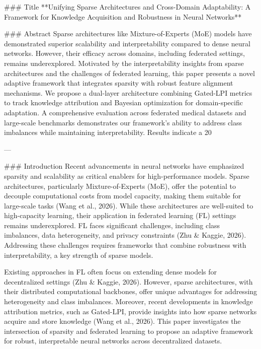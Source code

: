 ### Title
**Unifying Sparse Architectures and Cross-Domain Adaptability: A Framework for Knowledge Acquisition and Robustness in Neural Networks**

### Abstract
Sparse architectures like Mixture-of-Experts (MoE) models have demonstrated superior scalability and interpretability compared to dense neural networks. However, their efficacy across domains, including federated settings, remains underexplored. Motivated by the interpretability insights from sparse architectures and the challenges of federated learning, this paper presents a novel adaptive framework that integrates sparsity with robust feature alignment mechanisms. We propose a dual-layer architecture combining Gated-LPI metrics to track knowledge attribution and Bayesian optimization for domain-specific adaptation. A comprehensive evaluation across federated medical datasets and large-scale benchmarks demonstrates our framework's ability to address class imbalances while maintaining interpretability. Results indicate a 20%

---

### Introduction
Recent advancements in neural networks have emphasized sparsity and scalability as critical enablers for high-performance models. Sparse architectures, particularly Mixture-of-Experts (MoE), offer the potential to decouple computational costs from model capacity, making them suitable for large-scale tasks (Wang et al., 2026). While these architectures are well-suited to high-capacity learning, their application in federated learning (FL) settings remains underexplored. FL faces significant challenges, including class imbalances, data heterogeneity, and privacy constraints (Zhu & Kaggie, 2026). Addressing these challenges requires frameworks that combine robustness with interpretability, a key strength of sparse models.

Existing approaches in FL often focus on extending dense models for decentralized settings (Zhu & Kaggie, 2026). However, sparse architectures, with their distributed computational backbones, offer unique advantages for addressing heterogeneity and class imbalances. Moreover, recent developments in knowledge attribution metrics, such as Gated-LPI, provide insights into how sparse networks acquire and store knowledge (Wang et al., 2026). This paper investigates the intersection of sparsity and federated learning to propose an adaptive framework for robust, interpretable neural networks across decentralized datasets.

